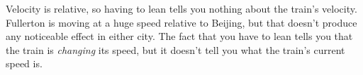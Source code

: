 Velocity is relative, so having to lean tells you nothing
about the train's velocity.  Fullerton is moving at a huge
speed relative to Beijing, but that doesn't produce any
noticeable effect in either city.  The fact that you have to
lean tells you that the train is \emph{changing} its speed,
but it doesn't tell you what the train's current speed is.



